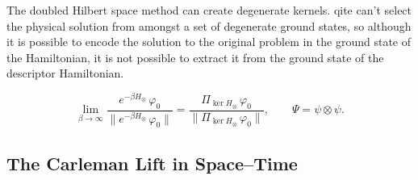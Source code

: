 The doubled Hilbert space method can create degenerate kernels. \Gls{qite} can't select the physical solution from amongst a set of degenerate ground states, so although it is possible to encode the solution to the original problem in the ground state of the Hamiltonian, it is not possible to extract it from the ground state of the descriptor Hamiltonian.

\begin{proposition}
\label{prop:no-penalty}
\begin{equation}
    \lim_{\beta\to\infty}\frac{e^{-\beta H_{\otimes}}\,\varphi_0}{\bigl\|e^{-\beta H_{\otimes}}\,\varphi_0\bigr\|}
    = \frac{\Pi_{\ker H_{\otimes}}\,\varphi_0}{\bigl\|\Pi_{\ker H_{\otimes}}\,\varphi_0\bigr\|},
    \qquad
    \Psi = \psi \otimes \psi .
    \label{eq:doubled-projection}
\end{equation}
\end{proposition}

\subsection{The Carleman Lift in Space--Time}
\label{sec:carleman}

